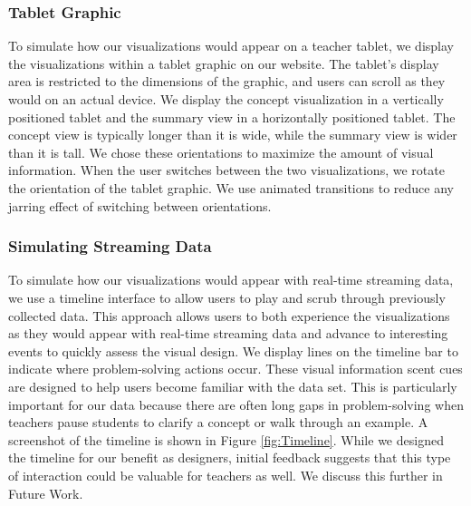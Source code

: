 \documentclass{sigchi}
\begin{document}
\subsubsection{Tablet Graphic}
To simulate how our visualizations would appear on a teacher tablet, we display the visualizations within a tablet graphic on our website. The tablet's display area is restricted to the dimensions of the graphic, and users can scroll as they would on an actual device. We display the concept visualization in a vertically positioned tablet and the summary view in a horizontally positioned tablet. The concept view is typically longer than it is wide, while the summary view is wider than it is tall. We chose these orientations to maximize the amount of visual information. When the user switches between the two visualizations, we rotate the orientation of the tablet graphic. We use animated transitions to reduce any jarring effect of switching between orientations.

\subsubsection{Simulating Streaming Data}
To simulate how our visualizations would appear with real-time streaming data, we use a timeline interface to allow users to play and scrub through previously collected data. This approach allows users to both experience the visualizations as they would appear with real-time streaming data and advance to interesting events to quickly assess the visual design. We display lines on the timeline bar to indicate where problem-solving actions occur. These visual information scent cues \cite{Willett07} are designed to help users become familiar with the data set. This is particularly important for our data because there are often long gaps in problem-solving when teachers pause students to clarify a concept or walk through an example. A screenshot of the timeline is shown in Figure \ref{fig:Timeline}. While we designed the timeline for our benefit as designers, initial feedback suggests that this type of interaction could be valuable for teachers as well. We discuss this further in Future Work.
\end{document}
